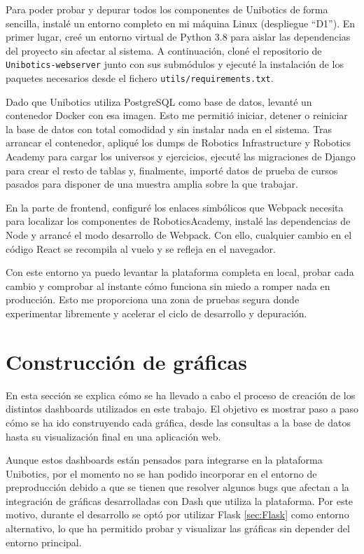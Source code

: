 \documentclass[a4paper, 12pt]{book}
\begin{document}
Para poder probar y depurar todos los componentes de Unibotics de forma sencilla, instalé un entorno completo en mi máquina Linux (despliegue “D1”). En primer lugar, creé un entorno virtual de Python 3.8 para aislar las dependencias del proyecto sin afectar al sistema. A continuación, cloné el repositorio de \texttt{Unibotics-webserver} junto con sus submódulos y ejecuté la instalación de los paquetes necesarios desde el fichero \texttt{utils/requirements.txt}.  

Dado que Unibotics utiliza PostgreSQL como base de datos, levanté un contenedor Docker con esa imagen. Esto me permitió iniciar, detener o reiniciar la base de datos con total comodidad y sin instalar nada en el sistema. Tras arrancar el contenedor, apliqué los dumps de Robotics Infrastructure y Robotics Academy para cargar los universos y ejercicios, ejecuté las migraciones de Django para crear el resto de tablas y, finalmente, importé datos de prueba de cursos pasados para disponer de una muestra amplia sobre la que trabajar.

En la parte de frontend, configuré los enlaces simbólicos que Webpack necesita para localizar los componentes de RoboticsAcademy, instalé las dependencias de Node y arrancé el modo desarrollo de Webpack. Con ello, cualquier cambio en el código React se recompila al vuelo y se refleja en el navegador.

Con este entorno ya puedo levantar la plataforma completa en local, probar cada cambio y comprobar al instante cómo funciona sin miedo a romper nada en producción. Esto me proporciona una zona de pruebas segura donde experimentar libremente y acelerar el ciclo de desarrollo y depuración.

\section{Construcción de gráficas}

En esta sección se explica cómo se ha llevado a cabo el proceso de creación de los distintos dashboards utilizados en este trabajo. El objetivo es mostrar paso a paso cómo se ha ido construyendo cada gráfica, desde las consultas a la base de datos hasta su visualización final en una aplicación web.

Aunque estos dashboards están pensados para integrarse en la plataforma Unibotics, por el momento no se han podido incorporar en el entorno de preproducción debido a que se tienen que resolver algunos bugs que afectan a la integración de gráficas desarrolladas con Dash que utiliza la plataforma. Por este motivo, durante el desarrollo se optó por utilizar Flask \ref{sec:Flask} como entorno alternativo, lo que ha permitido probar y visualizar las gráficas sin depender del entorno principal.
\end{document}
